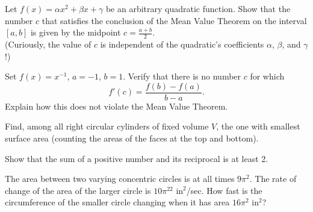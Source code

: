 \documentclass[12pt,letterpaper]{hmcpset}
\begin{document}

\begin{problem}[1]
  Let $f(x) = \alpha x^2+\beta x + \gamma$ be an arbitrary quadratic function. Show that the number $c$ that satisfies the conclusion of the Mean Value Theorem on the interval $[a, b]$ is given by the midpoint $c = \frac{a+b}{2}$. \\

  (Curiously, the value of $c$ is independent of the quadratic's coefficients $\alpha$, $\beta$, and $\gamma$!)
\end{problem}

\begin{solution}
\end{solution}
\pagebreak
\begin{problem}[2]
  Set $f(x) = x^{-1}$, $a = -1$, $b = 1$. Verify that there is no number $c$ for which
  \[ f'(c) = \frac{f(b) - f(a)}{b - a}. \]
  Explain how this does not violate the Mean Value Theorem.
\end{problem}
\begin{solution}

\end{solution}
\pagebreak
\begin{problem}[3]
Find, among all right circular cylinders of fixed volume $V$, the one with smallest surface area (counting the areas of the faces at the top and bottom).
\end{problem}
\begin{solution}

\end{solution}
\pagebreak
\begin{problem}[4]
  Show that the sum of a positive number and its reciprocal is at least 2.
\end{problem}
\begin{solution}

\end{solution}
\pagebreak
\begin{problem}[5]
  The area between two varying concentric circles is at all times $9\pi^2$.
  The rate of change of the area of the larger circle is $10\pi^22 \text{ in}^2$/sec.
  How fast is the circumference of the smaller circle changing when it has area $16\pi^2 \text{ in}^2$?
\end{problem}
\begin{solution}

\end{solution}
\pagebreak
\end{document}
